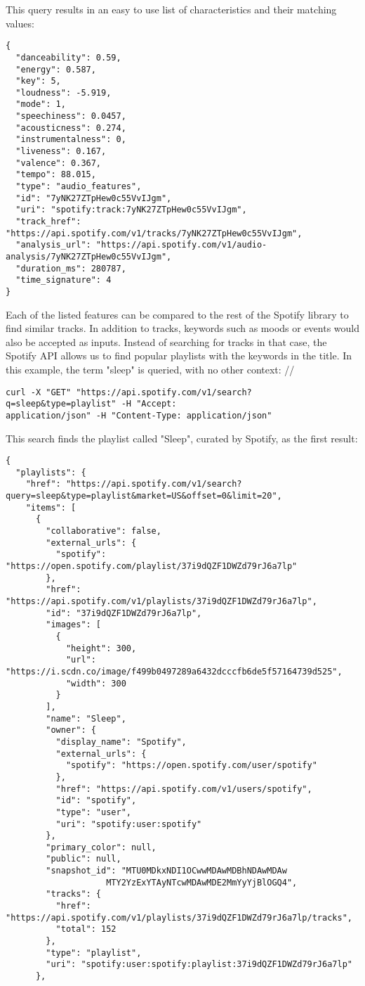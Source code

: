 This query results in an easy to use list of characteristics and their matching values:
\\

\begin{lstlisting}
{
  "danceability": 0.59,
  "energy": 0.587,
  "key": 5,
  "loudness": -5.919,
  "mode": 1,
  "speechiness": 0.0457,
  "acousticness": 0.274,
  "instrumentalness": 0,
  "liveness": 0.167,
  "valence": 0.367,
  "tempo": 88.015,
  "type": "audio_features",
  "id": "7yNK27ZTpHew0c55VvIJgm",
  "uri": "spotify:track:7yNK27ZTpHew0c55VvIJgm",
  "track_href": "https://api.spotify.com/v1/tracks/7yNK27ZTpHew0c55VvIJgm",
  "analysis_url": "https://api.spotify.com/v1/audio-analysis/7yNK27ZTpHew0c55VvIJgm",
  "duration_ms": 280787,
  "time_signature": 4
}
\end{lstlisting}

Each of the listed features can be compared to the rest of the Spotify library
to find similar tracks. In addition to tracks, keywords such as moods or events
would also be accepted as inputs. Instead of searching for tracks in that case, the
Spotify API allows us to find popular playlists with the keywords in the title.
In this example, the term "sleep" is queried, with no other context:
//

\begin{lstlisting}
curl -X "GET" "https://api.spotify.com/v1/search?q=sleep&type=playlist" -H "Accept:
application/json" -H "Content-Type: application/json"
\end{lstlisting}

This search finds the playlist called "Sleep", curated by Spotify, as the first result:
\\
\begin{lstlisting}
{
  "playlists": {
    "href": "https://api.spotify.com/v1/search?query=sleep&type=playlist&market=US&offset=0&limit=20",
    "items": [
      {
        "collaborative": false,
        "external_urls": {
          "spotify": "https://open.spotify.com/playlist/37i9dQZF1DWZd79rJ6a7lp"
        },
        "href": "https://api.spotify.com/v1/playlists/37i9dQZF1DWZd79rJ6a7lp",
        "id": "37i9dQZF1DWZd79rJ6a7lp",
        "images": [
          {
            "height": 300,
            "url": "https://i.scdn.co/image/f499b0497289a6432dcccfb6de5f57164739d525",
            "width": 300
          }
        ],
        "name": "Sleep",
        "owner": {
          "display_name": "Spotify",
          "external_urls": {
            "spotify": "https://open.spotify.com/user/spotify"
          },
          "href": "https://api.spotify.com/v1/users/spotify",
          "id": "spotify",
          "type": "user",
          "uri": "spotify:user:spotify"
        },
        "primary_color": null,
        "public": null,
        "snapshot_id": "MTU0MDkxNDI1OCwwMDAwMDBhNDAwMDAw
                    MTY2YzExYTAyNTcwMDAwMDE2MmYyYjBlOGQ4",
        "tracks": {
          "href": "https://api.spotify.com/v1/playlists/37i9dQZF1DWZd79rJ6a7lp/tracks",
          "total": 152
        },
        "type": "playlist",
        "uri": "spotify:user:spotify:playlist:37i9dQZF1DWZd79rJ6a7lp"
      },
\end{lstlisting}

